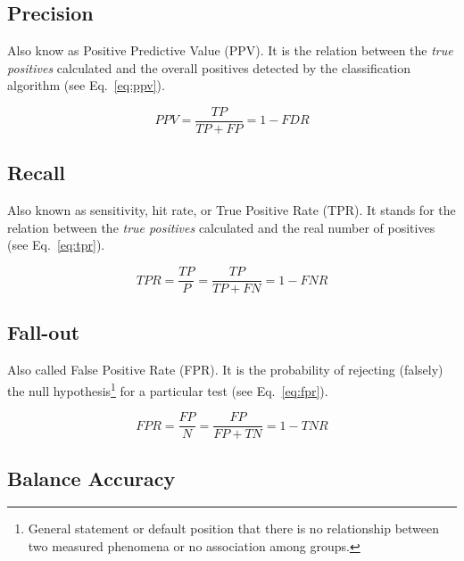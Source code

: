 \subsection{Precision}    
 
Also know as Positive Predictive Value (PPV). It is the relation 
between the \textit{true positives} calculated and the overall positives 
detected by the classification algorithm (see Eq.~\ref{eq:ppv}).
 
\begin{equation}\label{eq:ppv}
    PPV = \frac{TP}{TP + FP} = 1 - FDR
\end{equation}

\subsection{Recall} 

Also known as sensitivity, hit rate, or True Positive 
Rate (TPR). It stands for the relation between the \textit{true positives} 
calculated and the real number of positives (see Eq.~\ref{eq:tpr}).

\begin{equation}\label{eq:tpr}
    TPR = \frac{TP}{P} = \frac{TP}{TP + FN} = 1 - FNR
\end{equation}

\subsection{Fall-out}

Also called False Positive Rate (FPR). It is the probability of rejecting 
(falsely) the null hypothesis\footnote{General statement or default position
that there is no relationship between two measured phenomena or no
association among groups.} for a particular test (see Eq.~\ref{eq:fpr}).

\begin{equation}\label{eq:fpr}
    FPR = \frac{FP}{N} = \frac{FP}{FP + TN} = 1 - TNR
\end{equation}
    
\subsection{Balance Accuracy}


